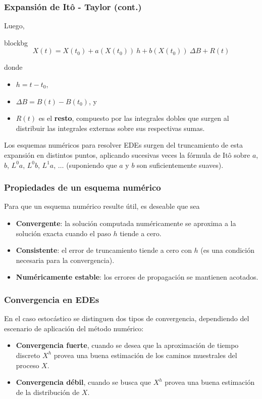 \documentclass[10pt]{beamer}
\begin{document}
\frame
{
    \frametitle{Expansión de Itô - Taylor (cont.)}

    Luego, \vspace*{0.2cm}

    \begin{beamercolorbox}[wd=1.02\textwidth,ht=0.7cm,rounded=true]{blockbg}
    $$X(t) = X(t_0) + a(X(t_0)) ~h + b(X(t_0)) ~\Delta B + R(t)$$
    \end{beamercolorbox}

    donde
    \begin{itemize}
        \item $h = t - t_0$,
        \item $\Delta B = B(t) - B(t_0)$, y
        \item $R(t)$ es el \textbf{resto}, compuesto por las integrales dobles que surgen al distribuir las integrales
        externas sobre sus respectivas sumas. 
    \end{itemize}

    Los esquemas numéricos para resolver EDEs surgen del truncamiento de esta expansión en distintos
    puntos, aplicando sucesivas veces la fórmula de Itô sobre $a$, $b$, $L^0 a$, $L^0 b$, $L^1 a$, $\dots$ 
    (suponiendo que $a$ y $b$ son suficientemente suaves). 
}

\frame
{
    \frametitle{Propiedades de un esquema numérico}

     Para que un esquema numérico resulte útil, es deseable que sea

    \begin{itemize}
        \item<2-> \textbf{Convergente}: la solución computada numéricamente
        se aproxima a la solución exacta cuando el paso $h$ tiende a cero.

        \item<3-> \textbf{Consistente}: el error de truncamiento tiende a cero
        con $h$ (es una condición necesaria para la convergencia).

        \item<4-> \textbf{Numéricamente estable}: los errores de propagación
        se mantienen acotados.
    \end{itemize}
}

\frame
{
    \frametitle{Convergencia en EDEs}

    En el caso estocástico se distinguen dos tipos de convergencia, 
    dependiendo del escenario de aplicación del método numérico:

    \begin{itemize}
        \item<2-> \textbf{Convergencia fuerte}, cuando se desea que 
        la aproximación de tiempo discreto $X^h$ provea una buena estimación de los caminos
        muestrales del proceso $X$. 

        \item<3-> \textbf{Convergencia débil}, cuando se busca que
        $X^h$ provea una buena estimación de la distribución de $X$.
    \end{itemize}
}
\end{document}
